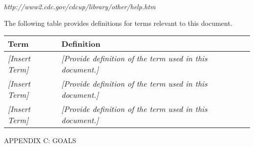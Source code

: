 \emph{http://www2.cdc.gov/cdcup/library/other/help.htm}

The following table provides definitions for terms relevant to this
document.

\begin{longtable}[]{@{}ll@{}}
\toprule
\textbf{Term} & \textbf{Definition}\tabularnewline
\midrule
\endhead
\emph{{[}Insert Term{]}} & \emph{{[}Provide definition of the term used
in this document.{]}}\tabularnewline
\emph{{[}Insert Term{]}} & \emph{{[}Provide definition of the term used
in this document.{]}}\tabularnewline
\emph{{[}Insert Term{]}} & \emph{{[}Provide definition of the term used
in this document.{]}}\tabularnewline
\bottomrule
\end{longtable}

\protect\hypertarget{_Toc141159352}{}{}APPENDIX C: GOALS

